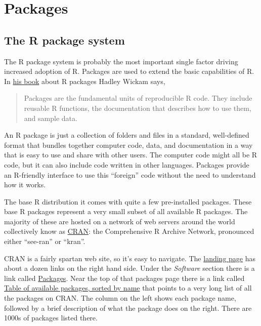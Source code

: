 \documentclass[
]{book}
\begin{document}
\hypertarget{packages}{%
\chapter{Packages}\label{packages}}

\hypertarget{package-system}{%
\section{The R package system}\label{package-system}}

The R package system is probably the most important single factor driving increased adoption of R. Packages are used to extend the basic capabilities of R. In \href{http://r-pkgs.had.co.nz}{his book} about R packages Hadley Wickam says,

\begin{quote}
Packages are the fundamental units of reproducible R code. They include reusable R functions, the documentation that describes how to use them, and sample data.
\end{quote}

An R package is just a collection of folders and files in a standard, well-defined format that bundles together computer code, data, and documentation in a way that is easy to use and share with other users. The computer code might all be R code, but it can also include code written in other languages. Packages provide an R-friendly interface to use this ``foreign'' code without the need to understand how it works.

The base R distribution it comes with quite a few pre-installed packages. These base R packages represent a very small subset of all available R packages. The majority of these are hosted on a network of web servers around the world collectively know as \href{http://cran.r-project.org}{CRAN}: the Comprehensive R Archive Network, pronounced either ``see-ran'' or ``kran''.

CRAN is a fairly spartan web site, so it's easy to navigate. The \href{http://cran.r-project.org}{landing page} has about a dozen links on the right hand side. Under the \emph{Software} section there is a link called \href{http://cran.r-project.org/web/packages/}{Packages}. Near the top of that packages page there is a link called \href{http://cran.r-project.org/web/packages/available_packages_by_name.html}{Table of available packages, sorted by name} that points to a very long list of all the packages on CRAN. The column on the left shows each package name, followed by a brief description of what the package does on the right. There are 1000s of packages listed there.
\end{document}

